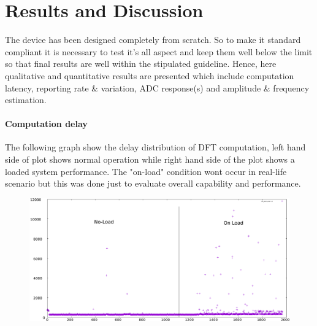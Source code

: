 \chapter{Results and Discussion}
The device has been designed completely from scratch. So to make it standard compliant it is necessary to test it's all aspect and keep them well below the limit so that final results are well within the stipulated guideline. Hence, here qualitative and quantitative results are presented which include computation latency, reporting rate \& variation, ADC response(s) and amplitude \& frequency estimation.

\subsubsection{Computation delay}
The following graph show the delay distribution of DFT computation, left hand side of plot shows normal operation while right hand side of the plot shows a loaded system performance. The "on-load" condition wont occur in real-life scenario but this was done just to evaluate overall capability and performance.
\begin{figure}[h]
	\includegraphics[scale=0.23]{fig/delay_test.eps}
\end{figure}
